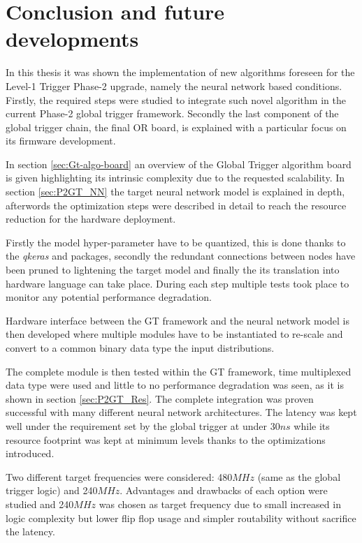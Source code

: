 \documentclass[../../main.tex]{subfiles}
\begin{document}
\chapter{Conclusion and future developments}
\label{sec:Conclusion}
In this thesis it was shown the implementation of new algorithms foreseen for the Level-1 Trigger Phase-2 upgrade, namely the neural network based conditions. Firstly, the required steps were studied to integrate such novel algorithm in the current Phase-2 global trigger framework. Secondly the last component of the global trigger chain, the final OR board, is explained with a particular focus on its firmware development.  

In section \ref{sec:Gt-algo-board} an overview of the Global Trigger algorithm board is given highlighting its intrinsic complexity due to the requested scalability.  
In section \ref{sec:P2GT_NN} the target neural network model is explained in depth, afterwords the optimization steps were described in detail to reach the resource reduction for the hardware deployment. 

Firstly the model hyper-parameter have to be quantized, this is done thanks to the \textit{qkeras} and  packages, secondly the redundant connections between nodes have been pruned to lightening the target model and finally the its translation into hardware language can take place. During each step multiple tests took place to monitor any potential performance degradation.

Hardware interface between the GT framework and the neural network model is then developed where multiple modules have to be instantiated to re-scale and convert to a common binary data type the input distributions.

The complete module is then tested within the GT framework, time multiplexed data type were used and little to no performance degradation was seen, as it is shown in section \ref{sec:P2GT_Res}. The complete integration was proven successful with many different neural network architectures. The latency was kept well under the requirement set by the global trigger at under 30$ns$ while its resource footprint was kept at minimum levels thanks to the optimizations introduced.

Two different target frequencies were considered: 480$MHz$ (same as the global trigger logic) and 240$MHz$. Advantages and drawbacks of each option were studied and 240$MHz$ was chosen as target frequency due to small increased in logic complexity but lower flip flop usage and simpler routability without sacrifice the latency.  
\end{document}
